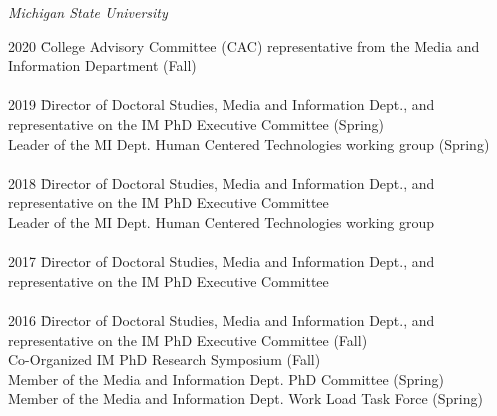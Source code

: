 \documentclass[9pt]{extarticle}
\begin{document}
\emph{Michigan State University} \\
\vspace{1pt}
\begin{tabbing}
2020 \hspace{0.3in}\= College Advisory Committee (CAC) representative from the Media and \\ 
\> \hspace{0.5cm} Information Department (Fall) \\\\

2019 \hspace{0.3in}\= Director of Doctoral Studies, Media and Information Dept., and \\
\> \hspace{0.5cm} representative on the IM PhD Executive Committee (Spring) \\
\> Leader of the MI Dept. Human Centered Technologies working group (Spring) \\\\

2018 \hspace{0.3in}\= Director of Doctoral Studies, Media and Information Dept., and \\
\> \hspace{0.5cm} representative on the IM PhD Executive Committee \\
\> Leader of the MI Dept. Human Centered Technologies working group \\\\

2017 \hspace{0.3in}\= Director of Doctoral Studies, Media and Information Dept., and \\
\> \hspace{0.5cm} representative on the IM PhD Executive Committee \\\\

2016 \hspace{0.3in}\= Director of Doctoral Studies, Media and Information Dept., and \\
\> \hspace{0.5cm} representative on the IM PhD Executive Committee (Fall) \\
\> Co-Organized IM PhD Research Symposium (Fall) \\ %
\> Member of the Media and Information Dept. PhD Committee (Spring) \\ 
\> Member of the Media and Information Dept. Work Load Task Force (Spring) \\\\


\end{tabbing}
\end{document}
